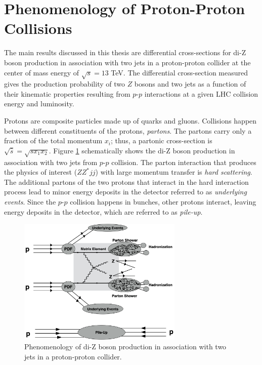 \section{Phenomenology of Proton-Proton Collisions }    
\label{sec:Pheno}

The main results discussed in this thesis are differential cross-sections for di-Z boson production in association with two jets in a proton-proton collider at the center of mass energy of $\sqrt{s}=13$ TeV. The differential cross-section measured gives the production probability of two $Z$ bosons and two jets as a function of their kinematic properties resulting from $p$-$p$ interactions at a given LHC collision energy and luminosity.

Protons are composite particles made up of quarks and gluons. Collisions happen between different constituents of the protons, \textit{partons}. The partons carry only a fraction of the total momentum $x_{i}$; thus, a partonic cross-section is $\sqrt{\hat{s}} = \sqrt{sx_1x_2}$. Figure \ref{fig:ColliderPheno} schematically shows the di-Z boson production in association with two jets from $p$-$p$ collision. The parton interaction that produces the physics of interest ($ZZ^*jj$) with large momentum transfer is \textit{hard scattering}. The additional partons of the two protons that interact in the hard interaction process lead to minor energy deposits in the detector referred to as \textit{underlying events}. Since the $p$-$p$ collision happens in bunches, other protons interact, leaving energy deposits in the detector, which are referred to as \textit{pile-up}.

\begin{figure}[!htb]
\centering
    \includegraphics[width=0.7\textwidth] {figures/Theory/ColliderPheno.pdf}\hspace{1cm}
    \caption{Phenomenology of di-Z boson production in association with two jets in a proton-proton collider.}
\label{fig:ColliderPheno}
\end{figure}

